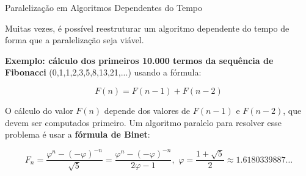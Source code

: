 \documentclass{beamer}
\begin{document}
	\begin{frame}{Paralelização em Algoritmos Dependentes do Tempo}
		
		Muitas vezes, é possível reestruturar um algoritmo dependente do tempo de forma que a paralelização seja viável.
		
		\vspace{0.2cm}
		\textbf{Exemplo: cálculo dos primeiros 10.000 termos da sequência de Fibonacci}  
		(0,1,1,2,3,5,8,13,21,...) usando a fórmula:
		
		\[
		F(n) = F(n-1) + F(n-2)
		\]
		
		O cálculo do valor \(F(n)\) depende dos valores de \(F(n-1)\) e \(F(n-2)\), que devem ser computados primeiro. Um algoritmo paralelo para resolver esse problema é usar a \textbf{fórmula de Binet}:
		
		\[
		F_n = \frac{\varphi^n - (-\varphi)^{-n}}{\sqrt{5}} = \frac{\varphi^n - (-\varphi)^{-n}}{2\varphi - 1},\,\,
		\varphi = \frac{1 + \sqrt{5}}{2} \approx 1.61803 39887\ldots
		\]
		
	\end{frame}
	
\end{document}
